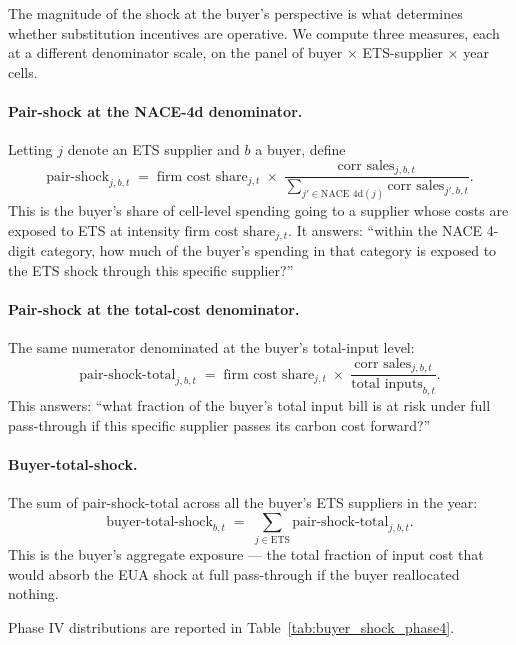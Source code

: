 The magnitude of the shock at the buyer's perspective is what determines whether substitution incentives are operative. We compute three measures, each at a different denominator scale, on the panel of buyer $\times$ ETS-supplier $\times$ year cells.

\paragraph{Pair-shock at the NACE-4d denominator.} Letting $j$ denote an ETS supplier and $b$ a buyer, define
\[
    \text{pair-shock}_{j,b,t} \;=\; \text{firm cost share}_{j,t} \;\times\; \frac{\text{corr sales}_{j,b,t}}{\sum_{j' \in \text{NACE 4d}(j)} \text{corr sales}_{j',b,t}}.
\]
This is the buyer's share of cell-level spending going to a supplier whose costs are exposed to ETS at intensity $\text{firm cost share}_{j,t}$. It answers: ``within the NACE 4-digit category, how much of the buyer's spending in that category is exposed to the ETS shock through this specific supplier?''

\paragraph{Pair-shock at the total-cost denominator.} The same numerator denominated at the buyer's total-input level:
\[
    \text{pair-shock-total}_{j,b,t} \;=\; \text{firm cost share}_{j,t} \;\times\; \frac{\text{corr sales}_{j,b,t}}{\text{total inputs}_{b,t}}.
\]
This answers: ``what fraction of the buyer's total input bill is at risk under full pass-through if this specific supplier passes its carbon cost forward?''

\paragraph{Buyer-total-shock.} The sum of pair-shock-total across all the buyer's ETS suppliers in the year:
\[
    \text{buyer-total-shock}_{b,t} \;=\; \sum_{j \in \text{ETS}} \text{pair-shock-total}_{j,b,t}.
\]
This is the buyer's aggregate exposure --- the total fraction of input cost that would absorb the EUA shock at full pass-through if the buyer reallocated nothing.

Phase IV distributions are reported in Table~\ref{tab:buyer_shock_phase4}.

